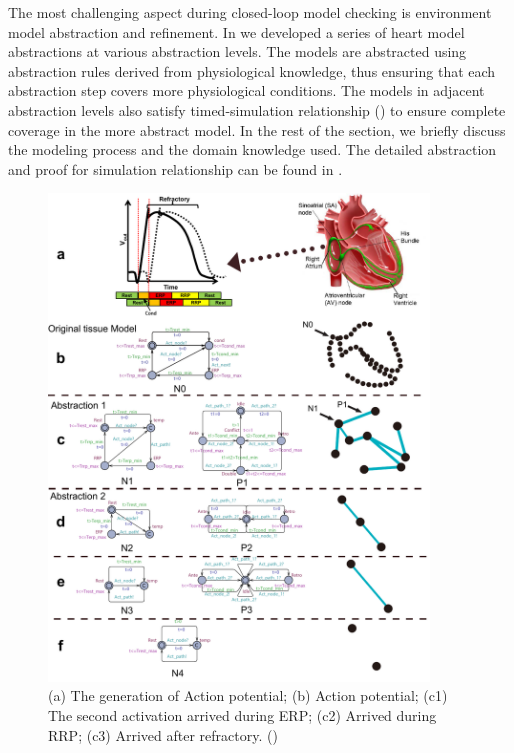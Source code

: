 \documentclass[openany]{now} %
\begin{document}
The most challenging aspect during closed-loop model checking is environment model abstraction and refinement. In \cite{STTT13} we developed a series of heart model abstractions at various abstraction levels. The models are abstracted using abstraction rules derived from physiological knowledge, thus ensuring that each abstraction step covers more physiological conditions. The models in adjacent abstraction levels also satisfy \textsf{timed-simulation} relationship (\cite{simulation}) to ensure complete coverage in the more abstract model. In the rest of the section, we briefly discuss the modeling process and the domain knowledge used. The detailed abstraction and proof for simulation relationship can be found in \cite{STTT13}.
\begin{figure}[!t]
\center
\includegraphics[width=0.9\textwidth]{figs/Heart_abs.pdf}
\caption{(a) The generation of Action potential; (b) Action potential; (c1) The second activation arrived during ERP; (c2) Arrived during RRP; (c3) Arrived after refractory. (\cite{STTT13})}
\label{fig:HM_abs}
\end{figure} 
\end{document}
